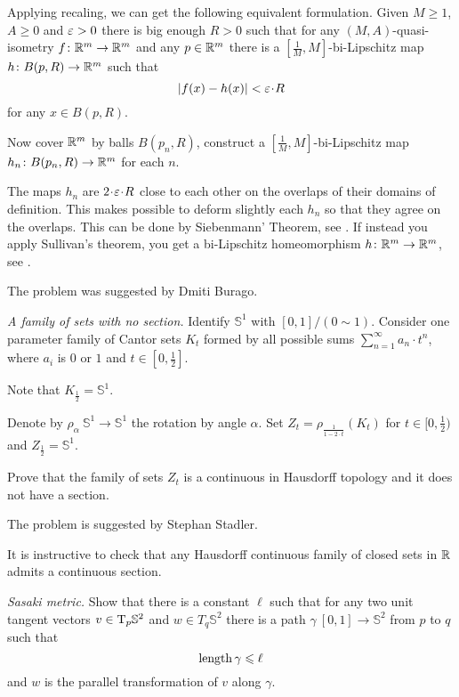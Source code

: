 Applying recaling, we can get the following equivalent formulation. 
Given $M\ge 1$, $A\ge 0$ and $\varepsilon>0$
there is big enough $R>0$ such that for any $(M,A)$-quasi-isometry 
$f\colon\mathbb{R}^m\to\mathbb{R}^m$ and any $p\in\mathbb{R}^m$ there is a $[\tfrac1M,M]$-bi-Lipschitz map $h\colon B(p,R)\to \mathbb{R}^m$
such that 
\[|f(x)-h(x)|<\eps\cdot R\]
for any $x\in B(p,R)$.

Now cover $\mathbb{R}^m$ by balls
$B(p_n,R)$, construct a $[\tfrac1M,M]$-bi-Lipschitz map $h_n\colon B(p_n,R)\to \mathbb{R}^m$ for each $n$.

The maps $h_n$ are $2\cdot \eps\cdot R$ close to each other on the overlaps of their domains of definition.
This makes possible to deform slightly each $h_n$ so that they agree on the overlaps.
This can be done by Siebenmann' Theorem, see \cite{siebenmann}.
If instead you apply Sullivan's theorem, you get a bi-Lipschitz homeomorphism $h\colon\mathbb{R}^m\to\mathbb{R}^m$,
see \cite{sullivan}.


The problem was suggested by Dmiti Burago.





\textit{A family of sets with no section.}
Identify $\mathbb{S}^1$ with $[0,1]/(0\sim 1)$.
Consider one parameter family of Cantor sets $K_t$
formed by all possible sums $\sum_{n=1}^\infty a_n\cdot t^n$,
where $a_i$ is $0$ or $1$ and $t\in[0,\tfrac12]$.

Note that $K_{\frac12}=\mathbb{S}^1$.

Denote by $\rho_\alpha\:\mathbb{S}^1\to\mathbb{S}^1$ 
the rotation by angle $\alpha$.
Set $Z_t=\rho_{\frac1{1-2\cdot t}}(K_t)$ for $t\in[0,\tfrac12)$ and $Z_{\frac12}=\mathbb{S}^1$.

Prove that the family of sets $Z_t$
is a continuous in Hausdorff topology and it does not have a section.

 The problem is suggested by Stephan Stadler.

It is instructive to check that any Hausdorff continuous family of closed sets in $\mathbb{R}$ admits a continuous section.



\textit{Sasaki metric.}
Show that there is a constant $\ell$
such that for any two unit tangent vectors $v\in\mathrm{T}_p\mathbb{S}^2$ 
and $w\in T_q\mathbb{S}^2$
there is a path 
$\gamma\:[0,1]\to\mathbb{S}^2$ from $p$ to $q$
such that 
\[\operatorname{\rm length} \gamma\leqslant \ell\] 
and
$w$ is the parallel transformation of $v$ along $\gamma$.

